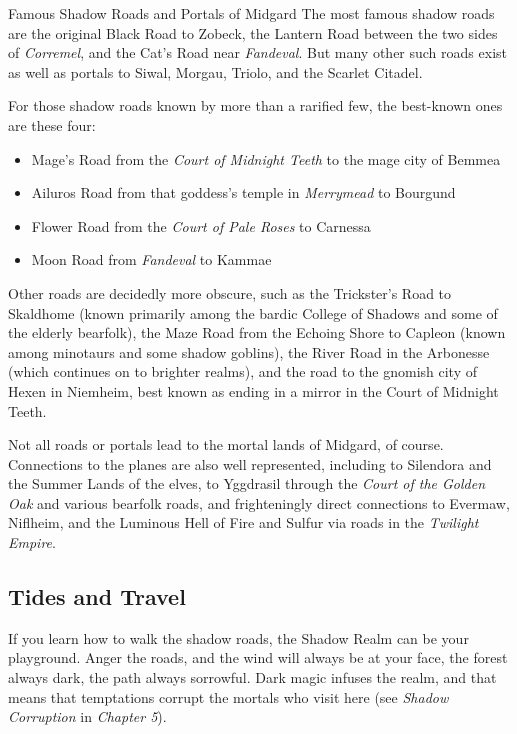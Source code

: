 \documentclass[10pt,a4paper,twoside,bg=print,twocolumn,openany,nodeprecatedcode]{dndbook}
\begin{document}
\begin{DndSidebar}[float=!b]{Famous Shadow Roads and Portals of Midgard}
The most famous shadow roads are the original Black Road to Zobeck, the Lantern Road between the two sides of \textit{Corremel}, and the Cat's Road near \textit{Fandeval}. But many other such roads exist as well as portals to Siwal, Morgau, Triolo, and the Scarlet Citadel.



For those shadow roads known by more than a rarified few, the best-known ones are these four:




\begin{itemize}
\item Mage's Road from the \textit{Court of Midnight Teeth} to the mage city of Bemmea
\item Ailuros Road from that goddess's temple in \textit{Merrymead} to Bourgund
\item Flower Road from the \textit{Court of Pale Roses} to Carnessa
\item Moon Road from \textit{Fandeval} to Kammae
\end{itemize}



Other roads are decidedly more obscure, such as the Trickster's Road to Skaldhome (known primarily among the bardic College of Shadows and some of the elderly bearfolk), the Maze Road from the Echoing Shore to Capleon (known among minotaurs and some shadow goblins), the River Road in the Arbonesse (which continues on to brighter realms), and the road to the gnomish city of Hexen in Niemheim, best known as ending in a mirror in the Court of Midnight Teeth.



Not all roads or portals lead to the mortal lands of Midgard, of course. Connections to the planes are also well represented, including to Silendora and the Summer Lands of the elves, to Yggdrasil through the \textit{Court of the Golden Oak} and various bearfolk roads, and frighteningly direct connections to Evermaw, Niflheim, and the Luminous Hell of Fire and Sulfur via roads in the \textit{Twilight Empire}.



\end{DndSidebar}

\subsection{Tides and Travel}
If you learn how to walk the shadow roads, the Shadow Realm can be your playground. Anger the roads, and the wind will always be at your face, the forest always dark, the path always sorrowful. Dark magic infuses the realm, and that means that temptations corrupt the mortals who visit here (see \textit{Shadow Corruption} in \textit{Chapter 5}).
\end{document}
